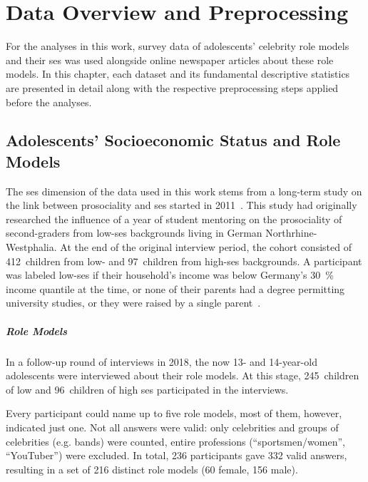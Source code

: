 \renewcommand{\imagepath}{../30-data/img}

\chapter{Data Overview and Preprocessing}\label{ch:data}
For the analyses in this work, survey data of adolescents' celebrity role models and their \gls{ses} was used alongside online newspaper articles about these role models. In this chapter, each dataset and its fundamental descriptive statistics are presented in detail along with the respective preprocessing steps applied before the analyses.

\section{Adolescents' Socioeconomic Status and Role Models}
The \gls{ses} dimension of the data used in this work stems from a long-term study on the link between prosociality and \gls{ses} started in 2011~\autocite{kosse_formation_2020}. This study had originally researched the influence of a year of student mentoring on the prosociality of second-graders from low-\gls{ses} backgrounds living in German Northrhine-Westphalia. At the end of the original interview period, the cohort consisted of \SI{412}{children} from low- and \SI{97}{children} from high-\gls{ses} backgrounds. A participant was labeled low-\gls{ses} if their household's income was below Germany's \SI{30}{\percent} income quantile at the time, or none of their parents had a degree permitting university studies, or they were raised by a single parent~\autocite{kosse_formation_2020}.

\paragraph{Role Models}
In a follow-up round of interviews in 2018, the now 13- and 14-year-old adolescents were interviewed about their role models. At this stage, \SI{245}{children} of low and \SI{96}{children} of high \gls{ses} participated in the interviews.

Every participant could name up to five role models, most of them, however, indicated just one. Not all answers were valid: only celebrities and groups of celebrities (e.g. bands) were counted, entire professions (``sportsmen/women'', ``YouTuber'') were excluded. In total, \SI{236}{} participants gave \SI{332}{} valid answers, resulting in a set of \SI{216}{} distinct role models (\SI{60}{} female, \SI{156}{} male).

